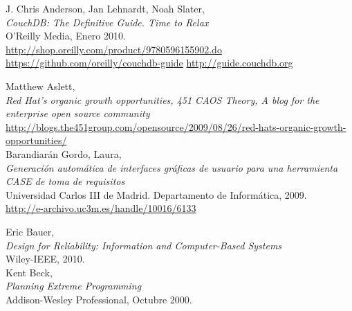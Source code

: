 \clearpage

\renewcommand{\bibname}{Bibliografía y Referencias}

\newcommand{\bibfont}{\small}      %

%
%
 
\begin{thebibliography}{XXX}

     J. Chris Anderson, Jan Lehnardt, Noah Slater,\\
    \newblock \emph{CouchDB: The Definitive Guide. Time to Relax}\\
    O'Reilly Media, Enero 2010.\\
    \url{http://shop.oreilly.com/product/9780596155902.do}
    \url{https://github.com/oreilly/couchdb-guide}
    \url{http://guide.couchdb.org}
    
     Matthew Aslett,\\ 
    \newblock \emph{Red Hat’s organic growth opportunities, 451 CAOS Theory, A blog
    for the enterprise open source community}\\
    \url{http://blogs.the451group.com/opensource/2009/08/26/red-hats-organic-growth-opportunities/}\\

     Barandiarán Gordo, Laura,\\
    \newblock \emph{Generación automática de interfaces gráficas de usuario 
    para una herramienta CASE de toma de requisitos}\\
    Universidad Carlos III de Madrid. Departamento de Informática, 2009.\\
    \url{http://e-archivo.uc3m.es/handle/10016/6133}
    
     Eric Bauer,\\
    \newblock \emph{Design for Reliability: Information and Computer-Based Systems}\\
    Wiley-IEEE, 2010.\\

     Kent Beck,\\
    \newblock \emph{Planning Extreme Programming}\\
    Addison-Wesley Professional, Octubre 2000.\\
    
    \newpage
    

\end{thebibliography}
